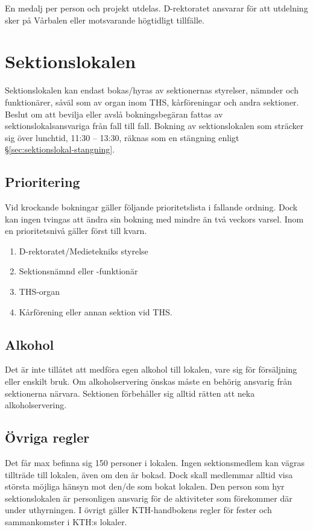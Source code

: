 \documentclass{dgovdoc}
\begin{document}
En medalj per person och projekt utdelas. D-rektoratet ansvarar för att utdelning sker på Vårbalen eller motsvarande högtidligt tillfälle.

\section{Sektionslokalen}

Sektionslokalen kan endast bokas/hyras av sektionernas styrelser, nämnder och
funktionärer, såväl som av organ inom THS, kårföreningar och andra sektioner.
Beslut om att bevilja eller avslå bokningsbegäran fattas av
sektionslokalsansvariga från fall till fall. Bokning av sektionslokalen som
sträcker sig över lunchtid, 11:30 -- 13:30, räknas som en stängning enligt
\S\ref{sec:sektionslokal-stangning}.

\subsection{Prioritering}

Vid krockande bokningar gäller följande prioritetslista i fallande ordning.
Dock kan ingen tvingas att ändra sin bokning med mindre än två veckors varsel.
Inom en prioritetsnivå gäller först till kvarn.

\begin{enumerate}
  \item D-rektoratet/Medietekniks styrelse
  \item Sektionsnämnd eller -funktionär
  \item THS-organ
  \item Kårförening eller annan sektion vid THS.
\end{enumerate}

\subsection{Alkohol}

Det är inte tillåtet att medföra egen alkohol till lokalen, vare sig för
försäljning eller enskilt bruk. Om alkoholservering önskas måste en behörig
ansvarig från sektionerna närvara. Sektionen förbehåller sig alltid rätten att
neka alkoholservering.

\subsection{Övriga regler}

Det får max befinna sig 150 personer i lokalen. Ingen sektionsmedlem kan vägras
tillträde till lokalen, även om den är bokad. Dock skall medlemmar alltid visa
största möjliga hänsyn mot den/de som bokat lokalen. Den person som hyr
sektionslokalen är personligen ansvarig för de aktiviteter som förekommer där
under uthyrningen. I övrigt gäller KTH-handbokens regler för fester och
sammankomster i KTH:s lokaler.
\end{document}
